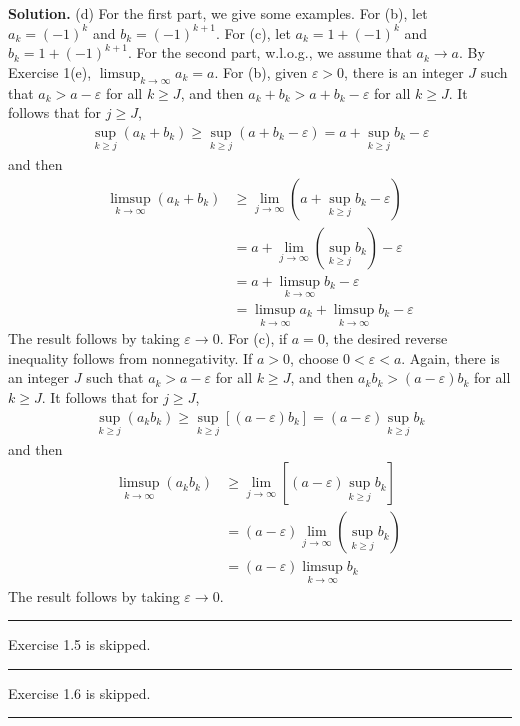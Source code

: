 \documentclass[12pt]{article}
\theoremstyle{definition}
\begin{document}
\smallskip
\noindent\textbf{Solution.}\quad
(d) For the first part, we give some examples. For (b), let $a_k=(-1)^k$ and $b_k=(-1)^{k+1}$. For (c), let $a_k=1+(-1)^k$ and $b_k=1+(-1)^{k+1}$. For the second part, w.l.o.g., we assume that $a_k\to a$. By Exercise 1(e), $\limsup_{k\to\infty}a_k=a$. For (b), given $\varepsilon>0$, there is an integer $J$ such that $a_k>a-\varepsilon$ for all $k\ge J$, and then $a_k+b_k>a+b_k-\varepsilon$ for all $k\ge J$. It follows that for $j\ge J$,
\begin{align*}
\sup_{k\ge j}(a_k+b_k)
\ge\sup_{k\ge j}(a+b_k-\varepsilon)
=a+\sup_{k\ge j}b_k-\varepsilon
\end{align*}
and then 
\begin{align*}
\limsup_{k\to\infty}(a_k+b_k)
&\ge \lim_{j\to\infty}\left(a+\sup_{k\ge j}b_k-\varepsilon\right) \\
&=a+\lim_{j\to\infty}\left(\sup_{k\ge j}b_k\right)-\varepsilon \\
&=a+\limsup_{k\to\infty}b_k-\varepsilon \\
&=\limsup_{k\to\infty}a_k+\limsup_{k\to\infty}b_k-\varepsilon
\end{align*}
The result follows by taking $\varepsilon\to 0$. For (c), if $a=0$, the desired reverse inequality follows from nonnegativity.  If $a>0$, choose $0<\varepsilon<a$. Again, there is an integer $J$ such that $a_k>a-\varepsilon$ for all $k\ge J$, and then $a_kb_k>(a-\varepsilon)b_k$ for all $k\ge J$. It follows that for $j\ge J$,
\begin{align*}
\sup_{k\ge j}(a_kb_k)
\ge\sup_{k\ge j}\left[(a-\varepsilon)b_k\right]
=(a-\varepsilon)\sup_{k\ge j}b_k
\end{align*}
and then
\begin{align*}
\limsup_{k\to\infty}(a_kb_k)
&\ge \lim_{j\to\infty}\left[(a-\varepsilon)\sup_{k\ge j}b_k\right] \\
&=(a-\varepsilon)\lim_{j\to\infty}\left(\sup_{k\ge j}b_k\right)\ \\
&=(a-\varepsilon)\limsup_{k\to\infty}b_k
\end{align*}
The result follows by taking $\varepsilon\to 0$.



\bigskip\noindent\hrule\bigskip

Exercise 1.5 is skipped.


\bigskip\noindent\hrule\bigskip

Exercise 1.6 is skipped.


\bigskip\noindent\hrule\bigskip
\end{document}
